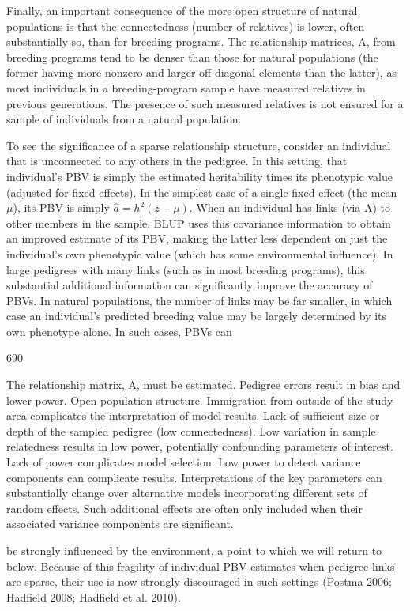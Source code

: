 \documentclass{article}
\begin{document}
Finally, an important consequence of the more open structure of natural populations is that the connectedness (number of relatives) is lower, often substantially so, than for breeding programs. The relationship matrices, A, from breeding programs tend to be denser than those for natural populations (the former having more nonzero and larger off-diagonal elements than the latter), as most individuals in a breeding-program sample have measured relatives in previous generations. The presence of such measured relatives is not ensured for a sample of individuals from a natural population.

To see the significance of a sparse relationship structure, consider an individual that is unconnected to any others in the pedigree. In this setting, that individual's PBV is simply the estimated heritability times its phenotypic value (adjusted for fixed effects). In the simplest case of a single fixed effect (the mean  $ \mu $), its PBV is simply  $ \hat{a} = h^2(z - \mu) $. When an individual has links (via A) to other members in the sample, BLUP uses this covariance information to obtain an improved estimate of its PBV, making the latter less dependent on just the individual's own phenotypic value (which has some environmental influence). In large pedigrees with many links (such as in most breeding programs), this substantial additional information can significantly improve the accuracy of PBVs. In natural populations, the number of links may be far smaller, in which case an individual's predicted breeding value may be largely determined by its own phenotype alone. In such cases, PBVs can

690

The relationship matrix, A, must be estimated.
Pedigree errors result in bias and lower power.
Open population structure.
Immigration from outside of the study area complicates the interpretation of model results.
Lack of sufficient size or depth of the sampled pedigree (low connectedness).
Low variation in sample relatedness results in low power, potentially confounding parameters of interest.
Lack of power complicates model selection.
Low power to detect variance components can complicate results. Interpretations of the key parameters can substantially change over alternative models incorporating different sets of random effects. Such additional effects are often only included when their associated variance components are significant.

be strongly influenced by the environment, a point to which we will return to below. Because of this fragility of individual PBV estimates when pedigree links are sparse, their use is now strongly discouraged in such settings (Postma 2006; Hadfield 2008; Hadfield et al. 2010).
\end{document}
